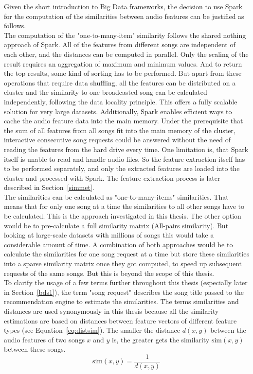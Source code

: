 Given the short introduction to Big Data frameworks, the decision to use Spark for the computation of the similarities between audio features can be justified as follows.\\
The computation of the "one-to-many-item" similarity follows the shared nothing approach of Spark. All of the features from different songs are independent of each other, and the distances can be computed in parallel. Only the scaling of the result requires an aggregation of maximum and minimum values. And to return the top results, some kind of sorting has to be performed. But apart from these operations that require data shuffling, all the features can be distributed on a cluster and the similarity to one broadcasted song can be calculated independently, following the data locality principle. This offers a fully scalable solution for very large datasets. Additionally, Spark enables efficient ways to cache the audio feature data into the main memory. Under the prerequisite that the sum of all features from all songs fit into the main memory of the cluster, interactive consecutive song requests could be answered without the need of reading the features from the hard drive every time.
One limitation is, that Spark itself is unable to read and handle audio files. So the feature extraction itself has to be performed separately, and only the extracted features are loaded into the cluster and processed with Spark. The feature extraction process is later described in Section~\ref{simmet}.\\
The similarities can be calculated as "one-to-many-items" similarities. That means that for only one song at a time the similarities to all other songs have to be calculated. This is the approach investigated in this thesis. The other option would be to pre-calculate a full similarity matrix (All-pairs similarity). But looking at large-scale datasets with millions of songs this would take a considerable amount of time. A combination of both approaches would be to calculate the similarities for one song request at a time but store these similarities into a sparse similarity matrix once they got computed, to speed up subsequent requests of the same songs. But this is beyond the scope of this thesis.\\ 
To clarify the usage of a few terms further throughout this thesis (especially later in Section~\ref{bds1}), the term "song request" describes the song title passed to the recommendation engine to estimate the similarities. The terms similarities and distances are used synonymously in this thesis because all the similarity estimations are based on distances between feature vectors of different feature types (see Equation~\eqref{eq:distsim}). The smaller the distance $d(x, y)$ between the audio features of two songs $x$ and $y$ is, the greater gets the similarity $\text{sim}(x, y)$ between these songs.\\
\begin{equation} \label{eq:distsim}
\text{sim}(x, y) = \frac{1}{d(x, y)}
\end{equation}

